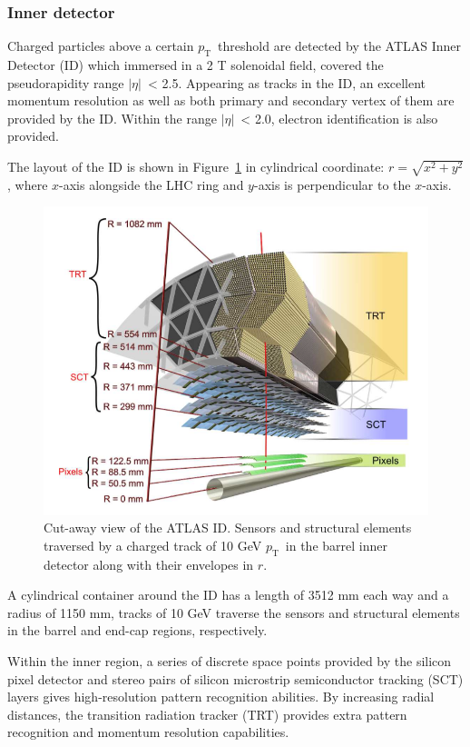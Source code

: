 \documentclass[UTF8,12pt]{ctexart}
\numberwithin{equation}{section}
\newcommand{\pt}{\ensuremath{p_{\mathrm{T}}\xspace}}
\def\abseta{$|$$\eta$$|$~}
\begin{document}
\subsubsection{Inner detector}
\label{sec:3.2.1}

Charged particles above a certain \pt~threshold are detected by the ATLAS Inner Detector (ID) which immersed in a 2 T solenoidal field, covered the pseudorapidity range \abseta < 2.5.
Appearing as tracks in the ID, an excellent momentum resolution as well as both primary and secondary vertex of them are provided by the ID.  Within the range \abseta < 2.0,  electron identification is also provided.

The layout of the ID is shown in Figure~\ref{Fig.id} in cylindrical coordinate: $r=\sqrt{x^2+y^2}$, where $x$-axis alongside the LHC ring and $y$-axis is perpendicular to the $x$-axis.
\begin{figure}[htb] 
	\centering  
	\includegraphics[width=13cm]{./fig/id.png}	\caption{Cut-away view of the ATLAS ID. Sensors and structural elements traversed by a charged track of 10 GeV \pt~in the barrel inner detector along with their envelopes in $r$.}
	\label{Fig.id}
\end{figure}

A cylindrical container around the ID has a length of 3512 mm each way and a radius of 1150 mm, tracks of 10 GeV traverse the sensors and structural elements in the barrel and end-cap regions, respectively.

Within the inner region, a series of discrete space points provided by the silicon pixel detector and stereo pairs of silicon microstrip semiconductor tracking (SCT) layers gives high-resolution pattern recognition abilities. By increasing radial distances, the transition radiation tracker (TRT) provides extra pattern recognition and momentum resolution capabilities.
\end{document}
